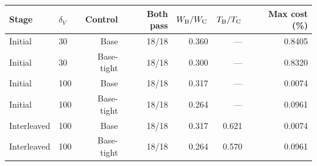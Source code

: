 \begin{tabular}{llrrrrr}
\toprule
Stage & $\delta_V$ & Control & Both pass & $W_{\rm B}/W_{\rm C}$ & $T_{\rm B}/T_{\rm C}$ & Max cost (\%)\\
\midrule
Initial & 30 & Base & 18/18 & 0.360 & --- & 0.8405\\
Initial & 30 & Base-tight & 18/18 & 0.300 & --- & 0.8320\\
Initial & 100 & Base & 18/18 & 0.317 & --- & 0.0074\\
Initial & 100 & Base-tight & 18/18 & 0.264 & --- & 0.0961\\
Interleaved & 100 & Base & 18/18 & 0.317 & 0.621 & 0.0074\\
Interleaved & 100 & Base-tight & 18/18 & 0.264 & 0.570 & 0.0961\\
\bottomrule
\end{tabular}
